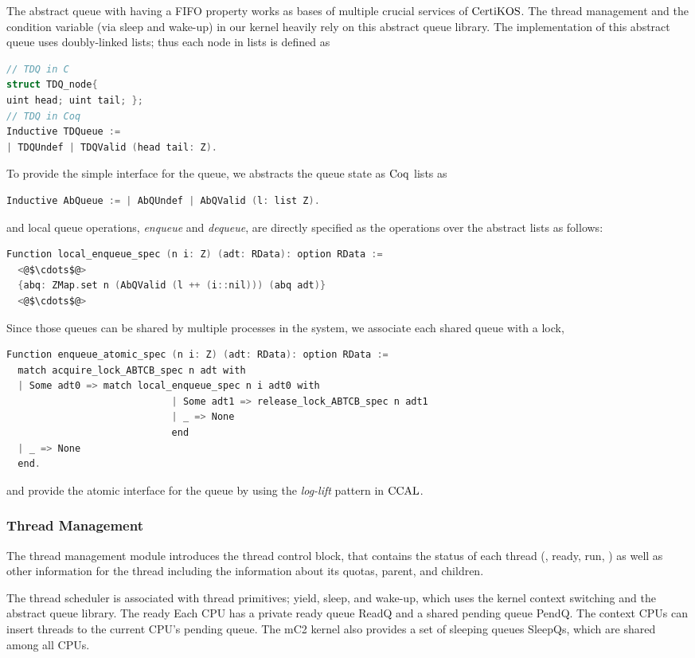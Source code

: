 The abstract queue with having a FIFO property works as bases of multiple crucial services of $\mathrm{CertiKOS}$. 
The thread management and the condition variable (via sleep and wake-up) in our kernel heavily rely on this abstract queue library. 
The implementation of this abstract queue uses 
doubly-linked lists; thus each node in lists is defined as 
\begin{lstlisting}[language = C, multicols=2]
// TDQ in C
struct TDQ_node{
uint head; uint tail; };
// TDQ in Coq
Inductive TDQueue :=
| TDQUndef | TDQValid (head tail: Z).   
\end{lstlisting}
To provide the simple interface for the queue, 
we abstracts the queue state as $\mathrm{Coq}$ lists as
\begin{lstlisting}[language = C]
Inductive AbQueue := | AbQUndef | AbQValid (l: list Z).
\end{lstlisting}
and local queue operations,
 \textit{enqueue} and \textit{dequeue},
are directly specified as the operations over the abstract lists as follows:
\begin{lstlisting}[language = C]
Function local_enqueue_spec (n i: Z) (adt: RData): option RData :=
  <@$\cdots$@>
  {abq: ZMap.set n (AbQValid (l ++ (i::nil))) (abq adt)}
  <@$\cdots$@>
\end{lstlisting}
Since those queues can be shared by multiple processes in the system, 
we associate each shared queue with a lock,
\begin{lstlisting}[language = C]
Function enqueue_atomic_spec (n i: Z) (adt: RData): option RData :=
  match acquire_lock_ABTCB_spec n adt with
  | Some adt0 => match local_enqueue_spec n i adt0 with
                             | Some adt1 => release_lock_ABTCB_spec n adt1
                             | _ => None
                             end
  | _ => None
  end.
\end{lstlisting}
and provide the atomic interface for the queue by using the \textit{log-lift} pattern in $\mathrm{CCAL}$.


\subsubsection{Thread Management}
The thread management module introduces the  thread control block, 
that contains the status of each thread (\ie, ready, run, \etc)
as well as other information for the thread including the information about its quotas, parent, and children.

The thread scheduler is associated with thread primitives; yield, sleep, and wake-up, which uses 
the kernel context switching and the abstract queue library. 
The ready
Each CPU has a private ready queue ReadQ and a shared pending queue PendQ. 
The context CPUs can insert threads to the current CPU’s pending queue. The mC2 kernel also provides a set of sleeping queues SleepQs, which are shared among all CPUs.

